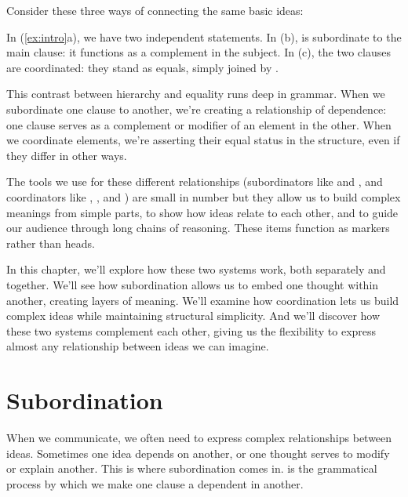 Consider these three ways of connecting the same basic ideas:

\ea \label{ex:intro}
    \z
\z
In (\ref{ex:intro}a), we have two independent statements. In (b),  is subordinate to the main clause: it functions as a complement in the subject. In (c), the two clauses are coordinated: they stand as equals, simply joined by .

This contrast between hierarchy and equality runs deep in grammar. When we subordinate one clause to another, we're creating a relationship of dependence: one clause serves as a complement or modifier of an element in the other. When we coordinate elements, we're asserting their equal status in the structure, even if they differ in other ways.

The tools we use for these different relationships (subordinators like  and , and coordinators like , , and ) are small in number but they allow us to build complex meanings from simple parts, to show how ideas relate to each other, and to guide our audience through long chains of reasoning. These items function as markers rather than heads.

In this chapter, we'll explore how these two systems work, both separately and together. We'll see how subordination allows us to embed one thought within another, creating layers of meaning. We'll examine how coordination lets us build complex ideas while maintaining structural simplicity. And we'll discover how these two systems complement each other, giving us the flexibility to express almost any relationship between ideas we can imagine.

\section{Subordination}\label{sec:subordination}

When we communicate, we often need to express complex relationships between ideas. Sometimes one idea depends on another, or one thought serves to modify or explain another. This is where subordination comes in.  is the grammatical process by which we make one clause a dependent in another.

